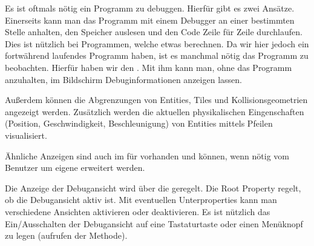 Es ist oftmals nötig ein Programm zu debuggen. Hierfür gibt es zwei Ansätze. Einerseits kann man das Programm mit einem Debugger an einer bestimmten Stelle anhalten, den Speicher auslesen und den Code Zeile für Zeile durchlaufen.
Dies ist nützlich bei Programmen, welche etwas berechnen. Da wir hier jedoch ein fortwährend laufendes Programm haben, ist es manchmal nötig das Programm  zu beobachten. Hierfür haben wir den . Mit ihm kann man, ohne das Programm anzuhalten, im Bildschirm Debuginformationen anzeigen lassen.


Außerdem können die Abgrenzungen von Entities, Tiles und Kollisionsgeometrien angezeigt werden. Zusätzlich werden die aktuellen physikalischen Eingenschaften (Position, Geschwindigkeit, Beschleunigung) von Entities mittels Pfeilen visualisiert.

Ähnliche Anzeigen sind auch im  für  vorhanden und können, wenn nötig vom Benutzer um eigene erweitert werden.


Die Anzeige der Debugansicht wird über die  geregelt. Die Root Property  regelt, ob die Debugansicht aktiv ist. Mit eventuellen Unterproperties kann man verschiedene Ansichten aktivieren oder deaktivieren. Es ist nützlich das Ein/Ausschalten der Debugansicht auf eine Tastaturtaste oder einen Menüknopf zu legen (aufrufen der  Methode).